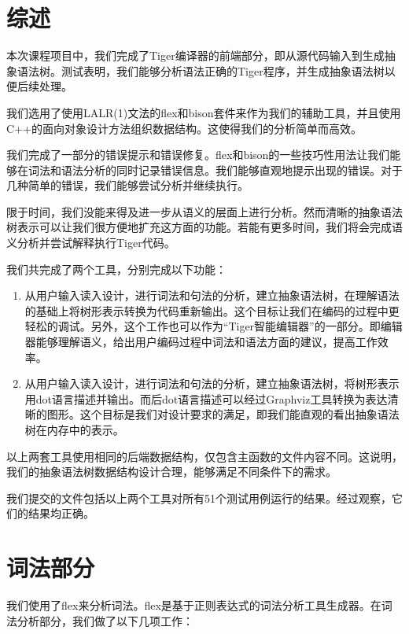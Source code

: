 



\section{综述}

本次课程项目中，我们完成了Tiger编译器的前端部分，即从源代码输入到生成抽象语法树。测试表明，我们能够分析语法正确的Tiger程序，并生成抽象语法树以便后续处理。

我们选用了使用LALR(1)文法的flex和bison套件来作为我们的辅助工具，并且使用C++的面向对象设计方法组织数据结构。这使得我们的分析简单而高效。

我们完成了一部分的错误提示和错误修复。flex和bison的一些技巧性用法让我们能够在词法和语法分析的同时记录错误信息。我们能够直观地提示出现的错误。对于几种简单的错误，我们能够尝试分析并继续执行。

限于时间，我们没能来得及进一步从语义的层面上进行分析。然而清晰的抽象语法树表示可以让我们很方便地扩充这方面的功能。若能有更多时间，我们将会完成语义分析并尝试解释执行Tiger代码。

我们共完成了两个工具，分别完成以下功能：

\begin{enumerate}
\item 从用户输入读入设计，进行词法和句法的分析，建立抽象语法树，在理解语法的基础上将树形表示转换为代码重新输出。这个目标让我们在编码的过程中更轻松的调试。另外，这个工作也可以作为“Tiger智能编辑器”的一部分。即编辑器能够理解语义，给出用户编码过程中词法和语法方面的建议，提高工作效率。
\item 从用户输入读入设计，进行词法和句法的分析，建立抽象语法树，将树形表示用dot语言描述并输出。而后dot语言描述可以经过Graphviz工具转换为表达清晰的图形。这个目标是我们对设计要求的满足，即我们能直观的看出抽象语法树在内存中的表示。
\end{enumerate}

以上两套工具使用相同的后端数据结构，仅包含主函数的文件内容不同。这说明，我们的抽象语法树数据结构设计合理，能够满足不同条件下的需求。

我们提交的文件包括以上两个工具对所有51个测试用例运行的结果。经过观察，它们的结果均正确。

\section{词法部分}

我们使用了flex来分析词法。flex是基于正则表达式的词法分析工具生成器。在词法分析部分，我们做了以下几项工作：

